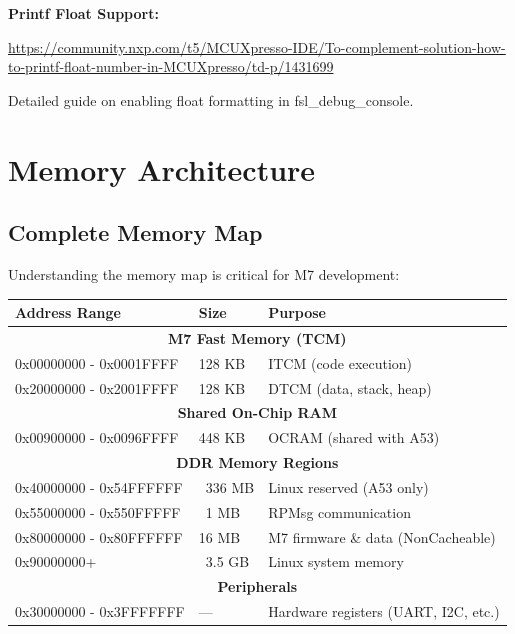\documentclass[12pt,a4paper]{report}
\begin{document}
\begin{docref}
\textbf{Printf Float Support:}

\url{https://community.nxp.com/t5/MCUXpresso-IDE/To-complement-solution-how-to-printf-float-number-in-MCUXpresso/td-p/1431699}

Detailed guide on enabling float formatting in fsl\_debug\_console.
\end{docref}

\section{Memory Architecture}

\subsection{Complete Memory Map}

Understanding the memory map is critical for M7 development:

\begin{center}
\begin{tabular}{|l|l|p{6cm}|}
\hline
\textbf{Address Range} & \textbf{Size} & \textbf{Purpose} \\
\hline
\multicolumn{3}{|c|}{\textbf{M7 Fast Memory (TCM)}} \\
\hline
0x00000000 - 0x0001FFFF & 128 KB & ITCM (code execution) \\
\hline
0x20000000 - 0x2001FFFF & 128 KB & DTCM (data, stack, heap) \\
\hline
\multicolumn{3}{|c|}{\textbf{Shared On-Chip RAM}} \\
\hline
0x00900000 - 0x0096FFFF & 448 KB & OCRAM (shared with A53) \\
\hline
\multicolumn{3}{|c|}{\textbf{DDR Memory Regions}} \\
\hline
0x40000000 - 0x54FFFFFF & ~336 MB & Linux reserved (A53 only) \\
\hline
0x55000000 - 0x550FFFFF & ~1 MB & RPMsg communication \\
\hline
0x80000000 - 0x80FFFFFF & 16 MB & M7 firmware \& data (NonCacheable) \\
\hline
0x90000000+ & ~3.5 GB & Linux system memory \\
\hline
\multicolumn{3}{|c|}{\textbf{Peripherals}} \\
\hline
0x30000000 - 0x3FFFFFFF & --- & Hardware registers (UART, I2C, etc.) \\
\hline
\end{tabular}
\end{center}
\end{document}
